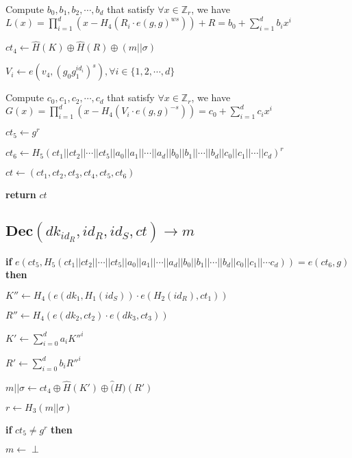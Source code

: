 \documentclass[a4paper]{article}
\begin{document}
Compute $b_0, b_1, b_2, \cdots, b_d$ that satisfy $\forall x \in \mathbb{Z}_r$, we have $L(x) = \prod\limits_{i = 1}^d (x - H_4(R_i \cdot e(g, g)^{ws})) + R = b_0 + \sum\limits_{i = 1}^d b_i x^i$

$\textit{ct}_4 \gets \hat{H}(K) \oplus \hat{H}(R) \oplus (m || \sigma)$

$V_i \gets e(v_4, (g_0 g_1^{\textit{id}_i})^s), \forall i \in \{1, 2, \cdots, d\}$

Compute $c_0, c_1, c_2, \cdots, c_d$ that satisfy $\forall x \in \mathbb{Z}_r$, we have $G(x) = \prod\limits_{i = 1}^d (x - H_4(V_i \cdot e(g, g)^{-s})) = c_0 + \sum\limits_{i = 1}^d c_i x^i$

$\textit{ct}_5 \gets g^r$

$\textit{ct}_6 \gets H_5(\textit{ct}_1 || \textit{ct}_2 || \cdots || \textit{ct}_5 || a_0 || a_1 || \cdots || a_d || b_0 || b_1 || \cdots || b_d || c_0 || c_1 || \cdots || c_d)^r$

$\textit{ct} \gets (\textit{ct}_1, \textit{ct}_2, \textit{ct}_3, \textit{ct}_4, \textit{ct}_5, \textit{ct}_6)$

\textbf{return} $\textit{ct}$

\subsection{$\textbf{Dec}(\textit{dk}_{\textit{id}_R}, \textit{id}_R, \textit{id}_S, \textit{ct}) \rightarrow m$}

\textbf{if} $e(\textit{ct}_5, H_5(\textit{ct}_1 || \textit{ct}_2 || \cdots || \textit{ct}_5 || a_0 || a_1 || \cdots || a_d || b_0 || b_1 || \cdots || b_d || c_0 || c_1 || \cdots c_d)) = e(\textit{ct}_6, g)$ \textbf{then}

\quad$K'' \gets H_4(e(\textit{dk}_1, H_1(\textit{id}_S)) \cdot e(H_2(\textit{id}_R), \textit{ct}_1))$

\quad$R'' \gets H_4(e(\textit{dk}_2, \textit{ct}_2) \cdot e(\textit{dk}_3, \textit{ct}_3))$

\quad$K' \gets \sum\limits_{i = 0}^d a_i K''^i$

\quad$R' \gets \sum\limits_{i = 0}^d b_i R''^i$

\quad$m || \sigma \gets \textit{ct}_4 \oplus \hat{H}(K') \oplus \hat(H)(R')$

\quad$r \gets H_3(m || \sigma)$

\quad\textbf{if} $\textit{ct}_5 \neq g^r$ \textbf{then}

\quad\quad$m \gets \perp$
\end{document}

